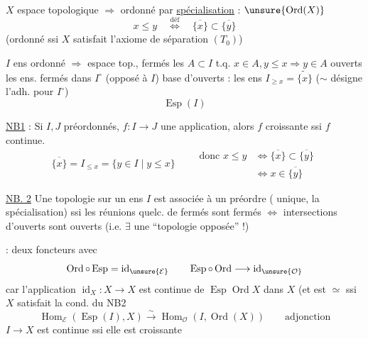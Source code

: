 
$X$ espace topologique $\Longrightarrow$ ordonné par \uline{spécialisation} : $\unsure{\operatorname{Ord}(X)}$
\[
x\leq y\quad\overset{\mathrm{déf}}{\Longleftrightarrow}\quad\overline{\{x\}}\subset\overline{\{y\}}
\]
(ordonné ssi $X$ satisfait l'axiome de séparation $(T_0)$)

$I$ ens ordonné $\Longrightarrow$ espace top., fermés les $A\subset I$ t.q. $x\in A,y\leq x\Rightarrow y\in A$
ouverts les ens. fermés dans $I^\circ$ (opposé à $I$)
base d'ouverts : les ens $I_{\geq x}=\widetilde{\{x\}}$ ($\sim$ désigne l'adh. pour $I^\circ$)
\[
\operatorname{Esp}(I)
\]

\uline{NB1} : Si $I,J$ préordonnés, $f:I\longrightarrow J$
une application, alors $f$ croissante ssi
$f$ continue.
\[
\overline{\{x\}}=I_{\leq x}=\{y\in I\mid y\leq x\}\qquad
\begin{aligned}
\text{donc }x\leq y&\Longleftrightarrow\overline{\{x\}}\subset\overline{\{y\}}\\
&\Longleftrightarrow x\in\overline{\{y\}}
\end{aligned}
\]

\uline{NB. 2} Une topologie sur un ens $I$ est associée à
un préordre ( unique, 
la spécialisation) ssi les réunions quelc. de
fermés sont fermés $\Longleftrightarrow$ intersections d'ouverts
sont ouverts (i.e. $\exists$ une ``topologie opposée'' !)

 : deux foncteurs
avec
\[
\operatorname{Ord}\circ\operatorname{Esp}=\operatorname{id}_{\unsure{\mathcal E}}
\qquad
\operatorname{Esp}\circ\operatorname{Ord}\longrightarrow\operatorname{id}_{\unsure{\mathcal O}}
\]
car l'application $\operatorname{id}_X:X\longrightarrow X$
est continue de $\operatorname{Esp}\operatorname{Ord}X$
dans $X$ (et est $\simeq$ ssi $X$
satisfait la cond. du NB2
\[
\operatorname{Hom}_{\mathcal E}(\operatorname{Esp}(I),X)\xrightarrow{\sim}
\operatorname{Hom}_{\mathcal O}(I,\operatorname{Ord}(X))\qquad\text{adjonction}
\]
$I\longrightarrow X$ est continue ssi elle est croissante

